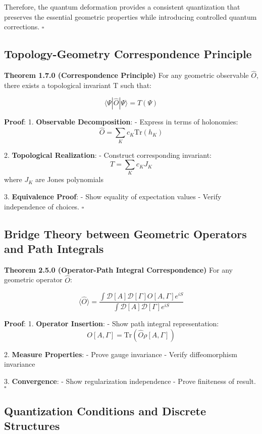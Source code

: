 \documentclass[12pt,a4paper]{article}
\begin{document}
Therefore, the quantum deformation provides a consistent quantization that preserves the essential geometric properties while introducing controlled quantum corrections. $\square$

\subsection{Topology-Geometry Correspondence Principle}

\textbf{Theorem 1.7.0 (Correspondence Principle)}
For any geometric observable $\hat{O}$, there exists a topological invariant T such that:

\[
\langle\Psi|\hat{O}|\Psi\rangle = T(\Psi)
\]

\textbf{Proof}:
1. \textbf{Observable Decomposition}:
   - Express in terms of holonomies:
     \[
     \hat{O} = \sum_K c_K \text{Tr}(h_K)
     \]

2. \textbf{Topological Realization}:
   - Construct corresponding invariant:
     \[
     T = \sum_K c_K J_K
     \]
   where $J_K$ are Jones polynomials

3. \textbf{Equivalence Proof}:
   - Show equality of expectation values
   - Verify independence of choices. $\square$

\subsection{Bridge Theory between Geometric Operators and Path Integrals}

\textbf{Theorem 2.5.0 (Operator-Path Integral Correspondence)}
For any geometric operator $\hat{O}$:

\[
\langle\hat{O}\rangle = \frac{\int \mathcal{D}[A]\mathcal{D}[\Gamma] O[A,\Gamma]e^{iS}}{\int \mathcal{D}[A]\mathcal{D}[\Gamma] e^{iS}}
\]

\textbf{Proof}:
1. \textbf{Operator Insertion}:
   - Show path integral representation:
     \[
     O[A,\Gamma] = \text{Tr}(\hat{O}\rho[A,\Gamma])
     \]

2. \textbf{Measure Properties}:
   - Prove gauge invariance
   - Verify diffeomorphism invariance

3. \textbf{Convergence}:
   - Show regularization independence
   - Prove finiteness of result. $\square$

\subsection{Quantization Conditions and Discrete Structures}
\end{document}
